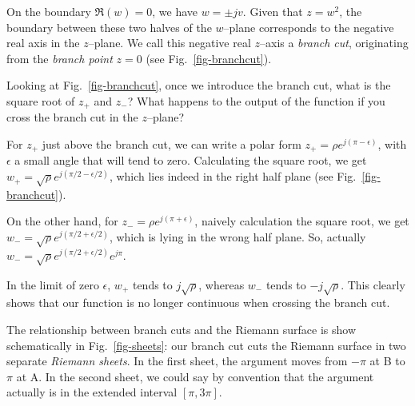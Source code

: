 On the boundary $\Re(w)=0$, we have $w=\pm jv$. Given that $z=w^2$, the boundary between these two halves of the $w$--plane corresponds to the negative real axis in the $z$--plane. We call this negative real $z$--axis a \emph{branch cut}, originating from the \emph{branch point} $z=0$ (see Fig.~\ref{fig-branchcut}).

\begin{cue}
Looking at Fig.~\ref{fig-branchcut}, once we introduce the branch cut, what is the square root of $z_+$ and $z_-$? What happens to the output of the function if you cross the branch cut in the $z$--plane? 
\end{cue}

For $z_+$ just above the branch cut, we can write a polar form $z_+ = \rho e^{j (\pi - \epsilon)}$, with $\epsilon$ a small angle that will tend to zero. Calculating the square root, we get $w_+ = \sqrt{\rho} e^{j (\pi/2 - \epsilon/2)}$, which lies indeed in the right half plane (see Fig.~\ref{fig-branchcut}).

On the other hand, for $z_- = \rho e^{j (\pi + \epsilon)}$, naively calculation the square root, we get $w_- = \sqrt{\rho} e^{j (\pi/2 + \epsilon/2)}$, which is lying in the wrong half plane. So, actually $w_- = \sqrt{\rho} e^{j (\pi/2 + \epsilon/2)} e^{j \pi}$.  

In the limit of zero $\epsilon$, $w_+$ tends to $j\sqrt{\rho}$, whereas $w_-$ tends to $-j\sqrt{\rho}$. This clearly shows that our function is no longer continuous when crossing the branch cut.

The relationship between branch cuts and the Riemann surface is show schematically in Fig.~\ref{fig-sheets}: our branch cut cuts the Riemann surface in two separate \emph{Riemann sheets}. In the first sheet, the argument moves from $-\pi$ at B to $\pi$ at A. In the second sheet, we could say by convention that the argument actually is in the extended interval $[\pi, 3\pi]$.

